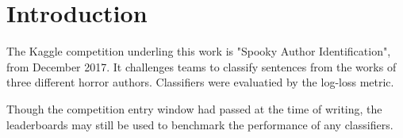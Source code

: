 \section{Introduction}
\label{sec:intro}
The Kaggle competition underling this work is "Spooky Author Identification", from December 2017. It challenges teams to classify sentences from the works of three
different horror authors. Classifiers were evaluatied by the log-loss metric.

Though the competition entry window had passed at the time of writing, the leaderboards may still be used to benchmark the performance of any classifiers.